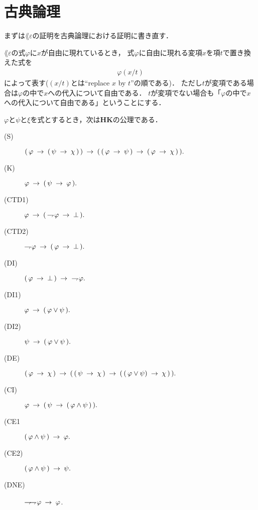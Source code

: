 \section{古典論理}
	まずは$\lang{\varepsilon}$の証明を古典論理における証明に書き直す．
	
	$\lang{\varepsilon}$の式$\varphi$に$x$が自由に現れているとき，
	式$\varphi$に自由に現れる変項$x$を項$t$で置き換えた式を
	\begin{align}
		\varphi(x/t)
	\end{align}
	によって表す($(x/t)$とは``replace $x$ by $t$''の順である)．
	ただし$t$が変項である場合は$\varphi$の中で$x$への代入について自由である．
	$t$が変項でない場合も「$\varphi$の中で$x$への代入について自由である」ということにする．
	
	\begin{screen}
		\begin{logicalaxm}
			$\varphi$と$\psi$と$\xi$を式とするとき，次は{\bf HK}の公理である．
			\begin{description}
				\item[(S)] $(\, \varphi \rarrow (\, \psi \rarrow \chi\, )\, ) 
					\rarrow (\, (\, \varphi \rarrow \psi\, )
					\rarrow (\, \varphi \rarrow \chi\, )\, ).$
				\item[(K)] $\varphi \rarrow (\, \psi \rarrow \varphi\, ).$
				\item[(CTD1)] $\varphi \rarrow (\, \negation \varphi \rarrow \bot\, ).$
				\item[(CTD2)] $\negation \varphi \rarrow (\, \varphi \rarrow \bot\, ).$
				\item[(DI)] $(\, \varphi \rarrow \bot\, ) \rarrow\ \negation \varphi.$
				\item[(DI1)] $\varphi \rarrow (\, \varphi \vee \psi\, ).$
				\item[(DI2)] $\psi \rarrow (\, \varphi \vee \psi\, ).$
				\item[(DE)] $(\, \varphi \rarrow \chi\, ) \rarrow 
					(\, (\, \psi \rarrow \chi\, ) 
					\rarrow (\, (\, \varphi \vee \psi) \rarrow \chi\, )\, ).$
				\item[(CI)] $\varphi \rarrow (\, \psi \rarrow (\, \varphi \wedge \psi\, )\, ).$
				\item[(CE1] $(\, \varphi \wedge \psi\, ) \rarrow \varphi.$
				\item[(CE2)] $(\, \varphi \wedge \psi\, ) \rarrow \psi.$
				\item[(DNE)] $\negation \negation \varphi \rarrow \varphi$.
			\end{description}
		\end{logicalaxm}
	\end{screen}
	
